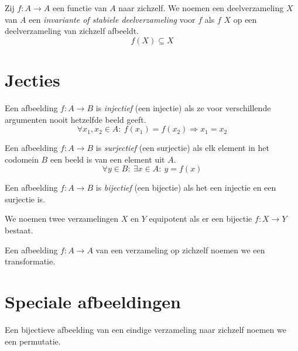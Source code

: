 \documentclass[main.tex]{subfiles}
\begin{document}
\begin{de}
  Zij $f: A \rightarrow A$ een functie van $A$ naar zichzelf.
  We noemen een deelverzameling $X$ van $A$ een \emph{invariante of stabiele deelverzameling} voor $f$ als $f$ $X$ op een deelverzameling van zichzelf afbeeldt.
  \[ f(X) \subseteq X \]
\end{de}

\section{Jecties}
\label{sec:jecties}

\begin{de}
  \label{de:afbeelding-injectief}
  Een afbeelding $f: A \rightarrow B$ is \emph{injectief} (een injectie) als ze voor verschillende argumenten nooit hetzelfde beeld geeft.
  \[ \forall x_{1},x_{2} \in A:\ f(x_{1}) = f(x_{2}) \Rightarrow x_{1}= x_{2} \]
\end{de}

\begin{de}
  \label{de:afbeelding-surjectief}
  Een afbeelding $f: A \rightarrow B$ is \emph{surjectief} (een surjectie) als elk element in het codomein $B$ een beeld is van een element uit $A$.
  \[ \forall y \in B:\ \exists x \in A:\ y = f(x) \]
\end{de}

\begin{de}
  \label{de:afbeelding-bijectief}
  Een afbeelding $f: A \rightarrow B$ is \emph{bijectief} (een bijectie) als het een injectie en een surjectie is.
\end{de}

\begin{de}
  We noemen twee verzamelingen $X$ en $Y$ equipotent als er een bijectie $f: X \rightarrow Y$ bestaat.
\end{de}

\begin{de}
  Een afbeelding $f: A \rightarrow A$ van een verzameling op zichzelf noemen we een transformatie.
\end{de}

\section{Speciale afbeeldingen}
\label{sec:spec-afbe}


\begin{de}
  Een bijectieve afbeelding van een eindige verzameling naar zichzelf noemen we een permutatie.
\end{de}
\end{document}
